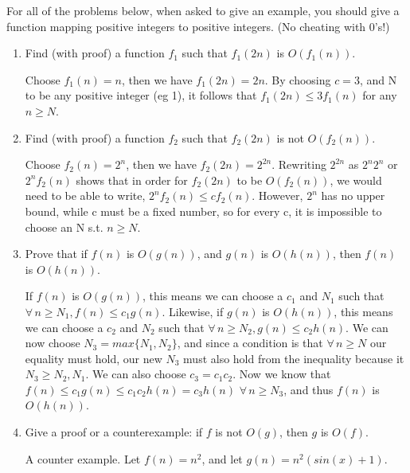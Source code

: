 \documentclass[11pt]{article}
\begin{document}
For all of the problems below, when asked to give an example, you
should give a function mapping positive integers to positive integers.
(No cheating with 0's!)
\begin{enumerate}
\item Find (with proof) a function $f_1$ such that $f_1(2n)$ is $O(f_1(n))$.

\begin{adjustwidth}{.5cm}{}
Choose $f_1(n) = n$, then we have $f_1(2n) = 2n$.  By choosing $c = 3$, and N to be any positive integer (eg 1), it follows that $f_1(2n) \leq 3f_1(n)$ for any $n \geq N$.
\end{adjustwidth}

\medskip

\item Find (with proof) a function $f_2$ such that $f_2(2n)$ is not $O(f_2(n))$.

\begin{adjustwidth}{.5cm}{}
Choose $f_2(n) = 2^n$, then we have $f_2(2n) = 2^{2n}$.  Rewriting $2^{2n}$ as $2^n2^n$ or $2^nf_2(n)$ shows that in order for $f_2(2n)$ to be $O(f_2(n))$, we would need to be able to write, $2^nf_2(n) \leq cf_2(n)$.  However, $2^n$ has no upper bound, while c must be a fixed number, so for every c, it is impossible to choose an N s.t. $n \geq N$.
\end{adjustwidth}
\medskip

\item Prove that if $f(n)$ is $O(g(n))$, and $g(n)$ is $O(h(n))$, then 
$f(n)$ is $O(h(n))$.  

\begin{adjustwidth}{.5cm}{}
If $f(n)$ is $O(g(n))$, this means we can choose a $c_1$ and $N_1$ such that $\forall \, n \geq N_1, f(n) \leq c_1g(n)$.  Likewise, if $g(n)$ is $O(h(n))$, this means we can choose a $c_2$ and $N_2$ such that $\forall \, n \geq N_2, g(n) \leq c_2h(n)$.  We can now choose $N_3 = max\{N_1, N_2\}$, and since a condition is that $\forall \, n \geq N$ our equality must hold, our new $N_3$ must also hold from the inequality because it $N_3 \geq N_2, N_1$.  We can also choose $c_3 = c_1c_2$. Now we know that $f(n) \leq c_1g(n) \leq c_1c_2h(n) = c_3h(n)\,\, \forall \, n \geq N_3$, and thus $f(n)$ is $O(h(n))$. 
\end{adjustwidth}
\medskip

\item Give a proof or a counterexample:  if $f$ is not $O(g)$, then $g$ is $O(f)$.  

\begin{adjustwidth}{.5cm}{}
A counter example.  Let $f(n) = n^2$, and let $g(n) = n^2(sin(x) + 1)$. 
\end{adjustwidth}
\medskip


\end{enumerate}
\end{document}
